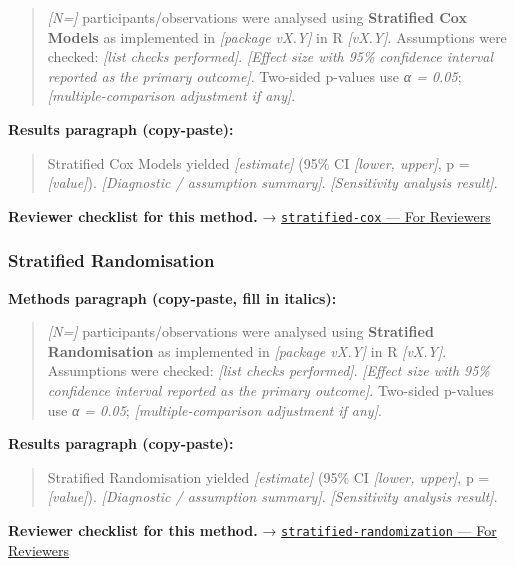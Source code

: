 \documentclass[
]{article}
\begin{document}
\begin{quote}
\emph{{[}N={]}} participants/observations were analysed using
\textbf{Stratified Cox Models} as implemented in \emph{{[}package
vX.Y{]}} in R \emph{{[}vX.Y{]}}. Assumptions were checked: \emph{{[}list
checks performed{]}}. \emph{{[}Effect size with 95\% confidence interval
reported as the primary outcome{]}}. Two-sided p-values use \emph{α =
0.05}; \emph{{[}multiple-comparison adjustment if any{]}}.
\end{quote}

\textbf{Results paragraph (copy-paste):}

\begin{quote}
Stratified Cox Models yielded \emph{{[}estimate{]}} (95\% CI
\emph{{[}lower, upper{]}}, p = \emph{{[}value{]}}). \emph{{[}Diagnostic
/ assumption summary{]}}. \emph{{[}Sensitivity analysis result{]}}.
\end{quote}

\textbf{Reviewer checklist for this method.} →
\href{../chapters/11-survival/stratified-cox.Rmd\#for-reviewers}{\texttt{stratified-cox}
--- For Reviewers}

\subsubsection{Stratified Randomisation}\label{stratified-randomisation}

\textbf{Methods paragraph (copy-paste, fill in italics):}

\begin{quote}
\emph{{[}N={]}} participants/observations were analysed using
\textbf{Stratified Randomisation} as implemented in \emph{{[}package
vX.Y{]}} in R \emph{{[}vX.Y{]}}. Assumptions were checked: \emph{{[}list
checks performed{]}}. \emph{{[}Effect size with 95\% confidence interval
reported as the primary outcome{]}}. Two-sided p-values use \emph{α =
0.05}; \emph{{[}multiple-comparison adjustment if any{]}}.
\end{quote}

\textbf{Results paragraph (copy-paste):}

\begin{quote}
Stratified Randomisation yielded \emph{{[}estimate{]}} (95\% CI
\emph{{[}lower, upper{]}}, p = \emph{{[}value{]}}). \emph{{[}Diagnostic
/ assumption summary{]}}. \emph{{[}Sensitivity analysis result{]}}.
\end{quote}

\textbf{Reviewer checklist for this method.} →
\href{../chapters/14-clinical/stratified-randomization.Rmd\#for-reviewers}{\texttt{stratified-randomization}
--- For Reviewers}
\end{document}

